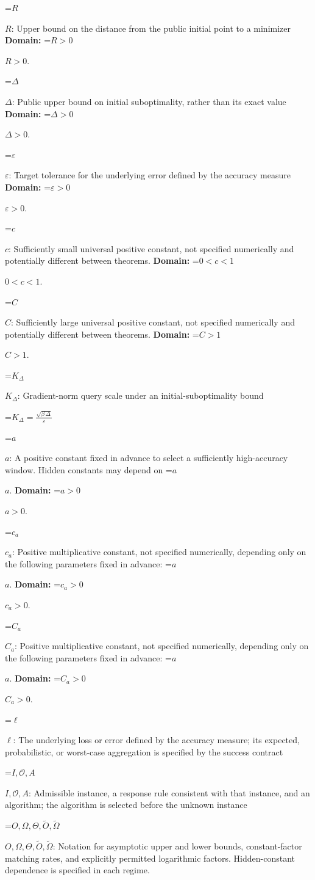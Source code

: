 \documentclass[10pt,a4paper]{article}
\newcommand{\AtlasMath}[1]{\par\begingroup\centering\setbox0=\hbox{$\displaystyle #1$}\ifdim\wd0>1.4\linewidth\typeout{ATLAS WIDE FORMULA: \the\wd0}\fi\ifdim\wd0>\linewidth\resizebox{\linewidth}{!}{\box0}\else\box0\fi\par\endgroup}
\newcommand{\AtlasInlineMath}[1]{\begingroup\setbox0=\hbox{$#1$}\ifdim\wd0>.4\linewidth\endgroup\AtlasMath{#1}\else\endgroup$#1$\fi}
\begin{document}
\AtlasInlineMath{R}: Upper bound on the distance from the public initial point to a minimizer \textbf{Domain:} \AtlasInlineMath{R>0}.

\AtlasInlineMath{\Delta}: Public upper bound on initial suboptimality, rather than its exact value \textbf{Domain:} \AtlasInlineMath{\Delta>0}.

\AtlasInlineMath{\varepsilon}: Target tolerance for the underlying error defined by the accuracy measure \textbf{Domain:} \AtlasInlineMath{\varepsilon>0}.

\AtlasInlineMath{c}: Sufficiently small universal positive constant, not specified numerically and potentially different between theorems. \textbf{Domain:} \AtlasInlineMath{0<c<1}.

\AtlasInlineMath{C}: Sufficiently large universal positive constant, not specified numerically and potentially different between theorems. \textbf{Domain:} \AtlasInlineMath{C>1}.

\AtlasInlineMath{K_\Delta}: Gradient-norm query scale under an initial-suboptimality bound


\AtlasMath{K_\Delta=\frac{\sqrt{\beta\,\Delta}}{\varepsilon}}


\AtlasInlineMath{a}: A positive constant fixed in advance to select a sufficiently high-accuracy window. Hidden constants may depend on \AtlasInlineMath{a}. \textbf{Domain:} \AtlasInlineMath{a>0}.

\AtlasInlineMath{c_{a}}: Positive multiplicative constant, not specified numerically, depending only on the following parameters fixed in advance: \AtlasInlineMath{a}. \textbf{Domain:} \AtlasInlineMath{c_{a}>0}.

\AtlasInlineMath{C_{a}}: Positive multiplicative constant, not specified numerically, depending only on the following parameters fixed in advance: \AtlasInlineMath{a}. \textbf{Domain:} \AtlasInlineMath{C_{a}>0}.

\AtlasInlineMath{\ell}: The underlying loss or error defined by the accuracy measure; its expected, probabilistic, or worst-case aggregation is specified by the success contract

\AtlasInlineMath{I,\mathcal{O},A}: Admissible instance, a response rule consistent with that instance, and an algorithm; the algorithm is selected before the unknown instance

\AtlasInlineMath{O,\Omega,\Theta,\widetilde{O},\widetilde\Omega}: Notation for asymptotic upper and lower bounds, constant-factor matching rates, and explicitly permitted logarithmic factors. Hidden-constant dependence is specified in each regime.
\end{document}
